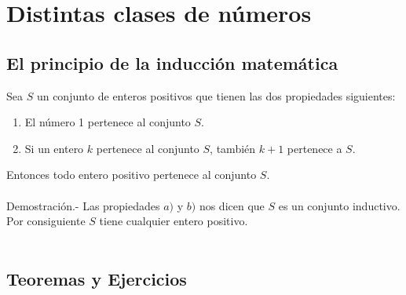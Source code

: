 \chapter{Distintas clases de números}
\section{El principio de la inducción matemática}
\begin{teo}
Sea $S$ un conjunto de enteros positivos que tienen las dos propiedades siguientes:
\begin{enumerate}[\bfseries a)]
\item El número 1 pertenece al conjunto $S$.
\item Si un entero $k$ pertenece al conjunto $S$, también $k+1$ pertenece a $S$.
\end{enumerate}
Entonces todo entero positivo pertenece al conjunto $S$.\\\\
Demostración.- \; Las propiedades $a)$ y $b)$ nos dicen que $S$ es un conjunto inductivo. Por consiguiente $S$ tiene cualquier entero positivo.\\\\ 
\end{teo}

\section{Teoremas y Ejercicios}
